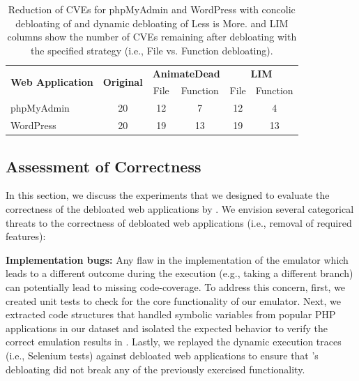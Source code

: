 {\begin{table}[]
    \caption{Reduction of CVEs for phpMyAdmin and WordPress with concolic debloating of \animatedead{} and dynamic debloating of Less is More. \animatedead{} and LIM columns show the number of CVEs remaining after debloating with the specified strategy (i.e., File vs. Function debloating).}
    \label{tab:cve_reduction}
    \centering
    \begin{adjustbox}{max width=\columnwidth}
    \begin{tabular}{|l|c|cc|cc|}
    \hline
    \multirow{2}{*}{\textbf{Web Application}} & \multirow{2}{*}{\textbf{Original}} & \multicolumn{2}{c|}{\textbf{AnimateDead}}                 & \multicolumn{2}{c|}{\textbf{LIM}}    \\ \cline{3-6} 
                                              &                                    & \multicolumn{1}{c|}{File} & \multicolumn{1}{c|}{Function} & \multicolumn{1}{c|}{File} & Function \\ \hline
    phpMyAdmin                                & 20                                 & \multicolumn{1}{c|}{12}    & 7                             & \multicolumn{1}{c|}{12}    & 4        \\ \hline
    WordPress                                 & 20                                 & \multicolumn{1}{c|}{19}   & 13                             & \multicolumn{1}{c|}{19}   & 13        \\ \hline
    \end{tabular}
    \end{adjustbox}
\end{table}

\subsection{Assessment of Correctness}
In this section, we discuss the experiments that we designed to evaluate the correctness of the debloated web applications by \animatedead{}. 
We envision several categorical threats to the correctness of debloated web applications (i.e., removal of required features): 

\noindent \textbf{Implementation bugs:} 
Any flaw in the implementation of the emulator which leads to a different outcome during the execution (e.g., taking a different branch) can potentially lead to missing code-coverage. 
To address this concern, first, we created unit tests to check for the core functionality of our emulator. 
Next, we extracted code structures that handled symbolic variables from popular PHP applications in our dataset and isolated the expected behavior to verify the correct emulation results in \animatedead{}. 
Lastly, we replayed the dynamic execution traces (i.e., Selenium tests) against debloated web applications to ensure that \animatedead{}'s debloating did not break any of the previously exercised functionality.

}
